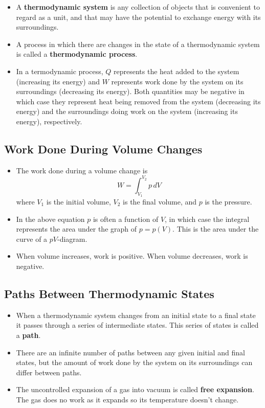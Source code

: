 \documentclass{article}
\begin{document}
\begin{itemize}
  \item A \textbf{thermodynamic system} is any collection of objects that is convenient to regard as a unit, and that may have the potential to exchange energy with its surroundings.

  \item A process in which there are changes in the state of a thermodynamic system is called a \textbf{thermodynamic process}.

  \item In a termodynamic process, $Q$ represents the heat added to the system (increasing its energy) and $W$ represents work done by the system on its surroundings (decreasing its energy). Both quantities may be negative in which case they represent heat being removed from the system (decreasing its energy) and the surroundings doing work on the system (increasing its energy), respectively.
\end{itemize}

\subsection{Work Done During Volume Changes}

\begin{itemize}
  \item The work done during a volume change is \[W = \int_{V_1}^{V_2} p \,dV\] where $V_1$ is the initial volume, $V_2$ is the final volume, and $p$ is the pressure.

  \item In the above equation $p$ is often a function of $V$, in which case the integral represents the area under the graph of $p = p(V)$. This is the area under the curve of a $p V$-diagram.

  \item When volume increases, work is positive. When volume decreases, work is negative.
\end{itemize}

\subsection{Paths Between Thermodynamic States}

\begin{itemize}
  \item When a thermodynamic system changes from an initial state to a final state it passes through a series of intermediate states. This series of states is called a \textbf{path}.

  \item There are an infinite number of paths between any given initial and final states, but the amount of work done by the system on its surroundings can differ between paths.

  \item The uncontrolled expansion of a gas into vacuum is called \textbf{free expansion}. The gas does no work as it expands so its temperature doesn't change.
\end{itemize}
\end{document}
